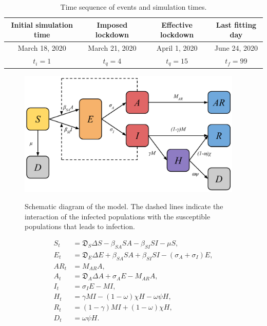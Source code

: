 \documentclass[11pt]{article}
\newcommand{\D}{\mathfrak{D}}
\begin{document}
	\begin{table}[h]
		\centering
		\caption{Time sequence of events and simulation times.}
		\label{tab:times}
		\begin{tabular}{ c c c c }
			\hline
			\hline
			Initial simulation time	&	Imposed lockdown	&	Effective lockdown	&	Last fitting day	\\
			\hline
			March 18, 2020	&	March 21, 2020	&	 April 1, 2020	&	June 24, 2020	\\
			$t_i = 1$	&	$t_q = 4$	&	$t_q = 15$	&	$t_f = 99$ \\
			\hline
			\hline
		\end{tabular}
	\end{table}
	
	\begin{figure}[h!]
		\centering
		\includegraphics[height=6cm]{full-model}
		\label{fig:model}
		\caption{Schematic diagram of the model. The dashed lines indicate the interaction of the infected populations with the susceptible populations that leads to infection.}
	\end{figure}

	\begin{align}
		\label{eq:s_t}
		S_t &=	\D_S \Delta S - \beta_{SA} S A - \beta_{SI} S I - \mu S, \\
		\label{eq:e_t}
		E_t	&=	\D_E \Delta E + \beta_{SA} S A + \beta_{SI} S I - (\sigma_A + \sigma_I) E, \\
		\label{eq:ar_t}
		AR_t &= M_{AR} A, \\
		\label{eq:a_t}
		A_t	&=	\D_A \Delta A + \sigma_A E - M_{AR} A, \\
		\label{eq:i_t}
		I_t	&=	\sigma_I E - M I, \\
		\label{eq:h_t}
		H_t	&=	\gamma M I - (1 - \omega) \chi H - \omega \psi H, \\
		\label{eq:r_t}
		R_t	&=	(1 - \gamma) M I + (1 - \omega) \chi H, \\
		\label{eq:d_t}
		D_t	&=	\omega \psi H.
	\end{align}
	
\end{document}
